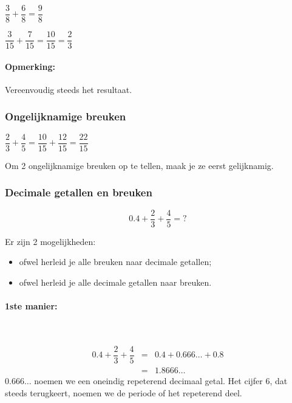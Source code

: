 \documentclass[12pt]{article}
\begin{document}
\begin{voorbeeld}
$\dfrac{3}{8} + \dfrac{6}{8} = \dfrac{9}{8}$
\end{voorbeeld}

\begin{voorbeeld}
$\dfrac{3}{15} + \dfrac{7}{15} = \dfrac{10}{15} = \dfrac{2}{3}$
\end{voorbeeld}

\paragraph*{Opmerking:}
Vereenvoudig steeds het resultaat.

\subsubsection{Ongelijknamige breuken}
$\dfrac{2}{3}+\dfrac{4}{5}=\dfrac{10}{15}+\dfrac{12}{15}=\dfrac{22}{15}$

\begin{onthoud}
Om 2 ongelijknamige breuken op te tellen, maak je ze eerst gelijknamig.
\end{onthoud}

\subsubsection{Decimale getallen en breuken}

$$0.4 + \dfrac{2}{3}+\dfrac{4}{5}= ?$$

Er zijn 2 mogelijkheden:
\begin{itemize}
  \item ofwel herleid je alle breuken naar decimale getallen;
  \item ofwel herleid je alle decimale getallen naar breuken.
\end{itemize}

\paragraph*{1ste manier:}\mbox{}\\

\begin{voorbeeld}
\begin{eqnarray*}
  0.4 + \dfrac{2}{3} + \dfrac{4}{5} &=& 0.4 + 0.666\ldots + 0.8\\
                                    &=& 1.8666\ldots
\end{eqnarray*}
$0.666\ldots$ noemen we een oneindig repeterend decimaal getal. Het cijfer $6$, dat steeds terugkeert, noemen we de periode of het repeterend deel.
\end{voorbeeld}
\end{document}

